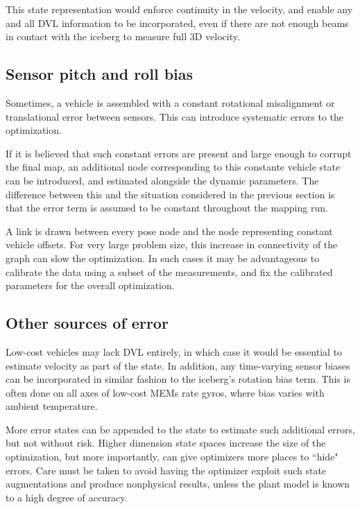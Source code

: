 This state representation would enforce continuity in the velocity, and enable any and all DVL information to be incorporated, even if there are not enough beams in contact with the iceberg to measure full 3D velocity.

\subsection{Sensor pitch and roll bias}

Sometimes, a vehicle is assembled with a constant rotational misalignment or translational error between sensors. This can introduce systematic errors to the optimization.

If it is believed that such constant errors are present and large enough to corrupt the final map, an additional node corresponding to this constante vehicle state can be introduced, and estimated alongside the dynamic parameters. The difference between this and the situation considered in the previous section is that the error term is assumed to be constant throughout the mapping run. 

A link is drawn between every pose node and the node representing constant vehicle offsets. For very large problem size, this increase in connectivity of the graph can slow the optimization. In such cases it may be advantageous to calibrate the data using a subset of the measurements, and fix the calibrated parameters for the overall optimization. 

\subsection{Other sources of error}

Low-cost vehicles may lack DVL entirely, in which case it would be essential to estimate velocity as part of the state. In addition, any time-varying sensor biases can be incorporated in similar fashion to the iceberg's rotation bias term. This is often done on all axes of low-cost MEMs rate gyros, where bias varies with ambient temperature. 

More error states can be appended to the state to estimate such additional errors, but not without risk. Higher dimension state spaces increase the size of the optimization, but more importantly, can give optimizers more places to ``hide" errors. Care must be taken to avoid having the optimizer exploit such state augmentations and produce nonphysical results, unless the plant model is known to a high degree of accuracy.
 
